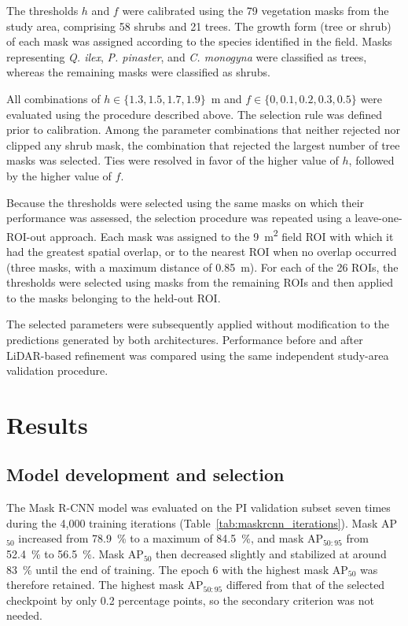 \documentclass[12pt,a4paper]{article}
\begin{document}
The thresholds $h$ and $f$ were calibrated using the 79 vegetation masks from the study area, comprising 58 shrubs and 21 trees. The growth form (tree or shrub) of each mask was assigned according to the species identified in the field. Masks representing \textit{Q. ilex}, \textit{P. pinaster}, and \textit{C. monogyna} were classified as trees, whereas the remaining masks were classified as shrubs.

All combinations of $h \in \{1.3, 1.5, 1.7, 1.9\}$~\unit{\metre} and $f \in \{0, 0.1, 0.2, 0.3, 0.5\}$ were evaluated using the procedure described above. The selection rule was defined prior to calibration. Among the parameter combinations that neither rejected nor clipped any shrub mask, the combination that rejected the largest number of tree masks was selected. Ties were resolved in favor of the higher value of $h$, followed by the higher value of $f$.

Because the thresholds were selected using the same masks on which their performance was assessed, the selection procedure was repeated using a leave-one-ROI-out approach. Each mask was assigned to the \qty{9}{\square\metre} field ROI with which it had the greatest spatial overlap, or to the nearest ROI when no overlap occurred (three masks, with a maximum distance of \qty{0.85}{\metre}). For each of the 26 ROIs, the thresholds were selected using masks from the remaining ROIs and then applied to the masks belonging to the held-out ROI.

The selected parameters were subsequently applied without modification to the predictions generated by both architectures. Performance before and after LiDAR-based refinement was compared using the same independent study-area validation procedure.

\section{Results}

\subsection{Model development and selection}

The Mask R-CNN model was evaluated on the PI validation subset seven times during the 4,000 training iterations (Table~\ref{tab:maskrcnn_iterations}). Mask AP$_{50}$ increased from \qty{78.9}{\percent} to a maximum of \qty{84.5}{\percent}, and mask AP$_{50:95}$ from \qty{52.4}{\percent} to \qty{56.5}{\percent}. Mask AP$_{50}$ then decreased slightly and stabilized at around \qty{83}{\percent} until the end of training. The epoch 6 with the highest mask AP$_{50}$ was therefore retained. The highest mask AP$_{50:95}$ differed from that of the selected checkpoint by only 0.2 percentage points, so the secondary criterion was not needed.
\end{document}
